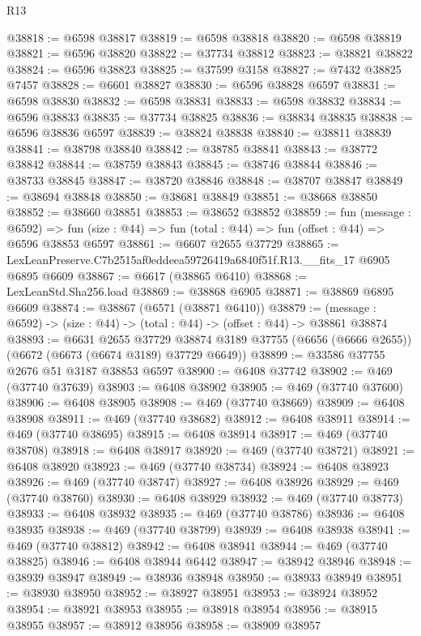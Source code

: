 \begin{lexlean}{R13}
\begin{coremodule}
@38818 := @6598 @38817
@38819 := @6598 @38818
@38820 := @6598 @38819
@38821 := @6596 @38820
@38822 := @37734 @38812
@38823 := @38821 @38822
@38824 := @6596 @38823
@38825 := @37599 @3158
@38827 := @7432 @38825 @7457
@38828 := @6601 @38827
@38830 := @6596 @38828 @6597
@38831 := @6598 @38830
@38832 := @6598 @38831
@38833 := @6598 @38832
@38834 := @6596 @38833
@38835 := @37734 @38825
@38836 := @38834 @38835
@38838 := @6596 @38836 @6597
@38839 := @38824 @38838
@38840 := @38811 @38839
@38841 := @38798 @38840
@38842 := @38785 @38841
@38843 := @38772 @38842
@38844 := @38759 @38843
@38845 := @38746 @38844
@38846 := @38733 @38845
@38847 := @38720 @38846
@38848 := @38707 @38847
@38849 := @38694 @38848
@38850 := @38681 @38849
@38851 := @38668 @38850
@38852 := @38660 @38851
@38853 := @38652 @38852
@38859 := fun (message : @6592) =>
  fun (size : @44) => fun (total : @44) => fun (offset : @44) => @6596 @38853 @6597
@38861 := @6607 @2655 @37729
@38865 := LexLeanPreserve.C7b2515af0eddeea59726419a6840f51f.R13.__fits_17 @6905 @6895 @6609
@38867 := @6617 (@38865 @6410)
@38868 := LexLeanStd.Sha256.load
@38869 := @38868 @6905
@38871 := @38869 @6895 @6609
@38874 := @38867 (@6571 (@38871 @6410))
@38879 := (message : @6592) -> (size : @44) -> (total : @44) -> (offset : @44) -> @38861 @38874
@38893 := @6631
    @2655
    @37729
    @38874
    @3189
    @37755
    (@6656 (@6666 @2655))
    (@6672 (@6673 (@6674 @3189) @37729 @6649))
@38899 := @33586 @37755 @2676 @51 @3187 @38853 @6597
@38900 := @6408 @37742
@38902 := @469 (@37740 @37639)
@38903 := @6408 @38902
@38905 := @469 (@37740 @37600)
@38906 := @6408 @38905
@38908 := @469 (@37740 @38669)
@38909 := @6408 @38908
@38911 := @469 (@37740 @38682)
@38912 := @6408 @38911
@38914 := @469 (@37740 @38695)
@38915 := @6408 @38914
@38917 := @469 (@37740 @38708)
@38918 := @6408 @38917
@38920 := @469 (@37740 @38721)
@38921 := @6408 @38920
@38923 := @469 (@37740 @38734)
@38924 := @6408 @38923
@38926 := @469 (@37740 @38747)
@38927 := @6408 @38926
@38929 := @469 (@37740 @38760)
@38930 := @6408 @38929
@38932 := @469 (@37740 @38773)
@38933 := @6408 @38932
@38935 := @469 (@37740 @38786)
@38936 := @6408 @38935
@38938 := @469 (@37740 @38799)
@38939 := @6408 @38938
@38941 := @469 (@37740 @38812)
@38942 := @6408 @38941
@38944 := @469 (@37740 @38825)
@38946 := @6408 @38944 @6442
@38947 := @38942 @38946
@38948 := @38939 @38947
@38949 := @38936 @38948
@38950 := @38933 @38949
@38951 := @38930 @38950
@38952 := @38927 @38951
@38953 := @38924 @38952
@38954 := @38921 @38953
@38955 := @38918 @38954
@38956 := @38915 @38955
@38957 := @38912 @38956
@38958 := @38909 @38957

\end{coremodule}
\end{lexlean}

